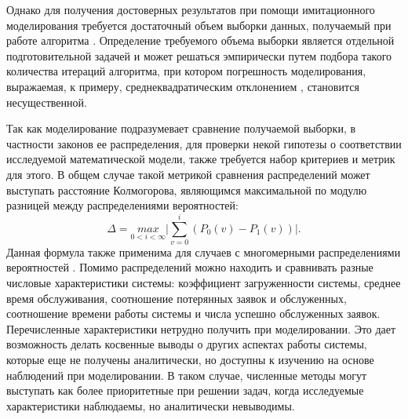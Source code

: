 Однако для получения достоверных результатов при помощи имитационного моделирования требуется достаточный объем выборки данных, получаемый при работе алгоритма \cite{лобач2004имитационное,моисеев2016исследование}. Определение требуемого объема выборки является отдельной подготовительной задачей и может решаться эмпирически путем подбора такого количества итераций алгоритма, при котором погрешность моделирования, выражаемая, к примеру, среднеквадратическим отклонением \cite{алиев2013погрешности}, становится несущественной.

Так как моделирование подразумевает сравнение получаемой выборки, в частности законов ее распределения, для проверки некой гипотезы о соответствии исследуемой математической модели, также требуется набор критериев и метрик для этого. В общем случае такой метрикой сравнения распределений может выступать расстояние Колмогорова, являющимся максимальной по модулю разницей между распределениями вероятностей:
\begin{equation}\label{kdistance}
	\Delta = \underset{0 < i < \infty}{max}\bigg\rvert \sum_{v=0}^{i} (P_0(v) - P_1(v))\bigg\rvert.
\end{equation}
Данная формула также применима для случаев с многомерными распределениями вероятностей \cite{fasano1987multidimensional}. Помимо распределений можно находить и сравнивать разные числовые характеристики системы: коэффициент загруженности системы, среднее время обслуживания, соотношение потерянных заявок и обслуженных, соотношение времени работы системы и числа успешно обслуженных заявок. Перечисленные характеристики нетрудно получить при моделировании. Это дает возможность делать косвенные выводы о других аспектах работы системы, которые еще не получены аналитически, но доступны к изучению на основе наблюдений при моделировании. В таком случае, численные методы могут выступать как более приоритетные при решении задач, когда исследуемые характеристики наблюдаемы, но аналитически невыводимы.
